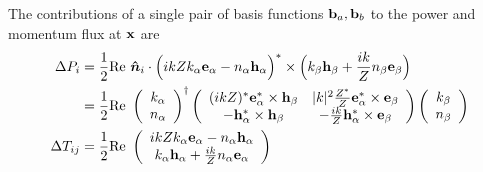 \documentclass[letterpaper]{article}
\begin{document}
The contributions of a single pair of basis functions
$\mathbf{b}_a, \mathbf{b}_b$ to the power and momentum flux
at $\mathbf{x}$ are
\begin{align}
 \Delta P_i
 &= \frac{1}{2}\text{Re }
    \boldsymbol{\hat{n}}_i
    \cdot 
    \Big(ikZ k_\alpha \mathbf{e}_\alpha - n_\alpha \mathbf{h}_\alpha\Big)^* 
    \times
    \Big( k_\beta \mathbf{h}_\beta + \frac{ik}{Z} n_\beta \mathbf{e}_\beta \Big)
\\
&= \frac{1}{2}\text{Re }
   \left(\begin{array}{c}
     k_\alpha \\ n_\alpha 
   \end{array}\right)^\dagger
   \left(\begin{array}{cc}
    (ikZ)^*              \mathbf{e}^*_\alpha \times \mathbf{h}_\beta & 
    |k|^2 \frac{Z^*}{Z}  \mathbf{e}^*_\alpha \times \mathbf{e}_\beta \\
  -                      \mathbf{h}^*_\alpha \times \mathbf{h}_\beta & 
  - \frac{ik}{Z}         \mathbf{h}^*_\alpha \times \mathbf{e}_\beta
   \end{array}\right)
   \left(\begin{array}{c}
     k_\beta\\ n_\beta
   \end{array}\right)
\\
 \Delta T_{ij}
 &= \frac{1}{2}\text{Re }
    \left(\begin{array}{c}
    ikZ k_\alpha \mathbf{e}_\alpha - n_\alpha \mathbf{h}_\alpha \\
        k_\alpha \mathbf{h}_\alpha + \frac{ik}{Z} n_\alpha \mathbf{e}_\alpha
    \end{array}\right)
\end{align}

\newpage


\end{document}
